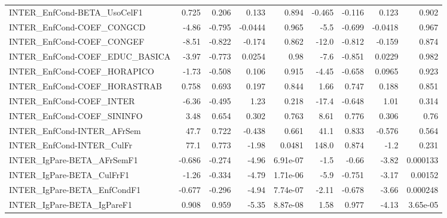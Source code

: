 \begin{tabular}{lrrrrrrrr}
INTER\_EnfCond-BETA\_UsoCelF1           &       0.725 &        0.206 &   0.133 &    0.894 &     -0.465 &      -0.116 &        0.123 &         0.902 \\
INTER\_EnfCond-COEF\_CONGCD             &       -4.86 &       -0.795 & -0.0444 &    0.965 &       -5.5 &      -0.699 &      -0.0418 &         0.967 \\
INTER\_EnfCond-COEF\_CONGEF             &       -8.51 &       -0.822 &  -0.174 &    0.862 &      -12.0 &      -0.812 &       -0.159 &         0.874 \\
INTER\_EnfCond-COEF\_EDUC\_BASICA        &       -3.97 &       -0.773 &  0.0254 &     0.98 &       -7.6 &      -0.851 &       0.0229 &         0.982 \\
INTER\_EnfCond-COEF\_HORAPICO           &       -1.73 &       -0.508 &   0.106 &    0.915 &      -4.45 &      -0.658 &       0.0965 &         0.923 \\
INTER\_EnfCond-COEF\_HORASTRAB          &       0.758 &        0.693 &   0.197 &    0.844 &       1.66 &       0.747 &        0.188 &         0.851 \\
INTER\_EnfCond-COEF\_INTER              &       -6.36 &       -0.495 &    1.23 &    0.218 &      -17.4 &      -0.648 &         1.01 &         0.314 \\
INTER\_EnfCond-COEF\_SININFO            &        3.48 &        0.654 &   0.302 &    0.763 &       8.61 &       0.776 &        0.306 &          0.76 \\
INTER\_EnfCond-INTER\_AFrSem            &        47.7 &        0.722 &  -0.438 &    0.661 &       41.1 &       0.833 &       -0.576 &         0.564 \\
INTER\_EnfCond-INTER\_CulFr             &        77.1 &        0.773 &   -1.98 &   0.0481 &      148.0 &       0.874 &         -1.2 &         0.231 \\
INTER\_IgPare-BETA\_AFrSemF1            &      -0.686 &       -0.274 &   -4.96 & 6.91e-07 &       -1.5 &       -0.66 &        -3.82 &      0.000133 \\
INTER\_IgPare-BETA\_CulFrF1             &       -1.26 &       -0.334 &   -4.79 & 1.71e-06 &       -5.9 &      -0.751 &        -3.17 &       0.00152 \\
INTER\_IgPare-BETA\_EnfCondF1           &      -0.677 &       -0.296 &   -4.94 & 7.74e-07 &      -2.11 &      -0.678 &        -3.66 &      0.000248 \\
INTER\_IgPare-BETA\_IgPareF1            &       0.908 &        0.959 &   -5.35 & 8.87e-08 &       1.58 &       0.977 &        -4.13 &      3.65e-05 \\

\end{tabular}
